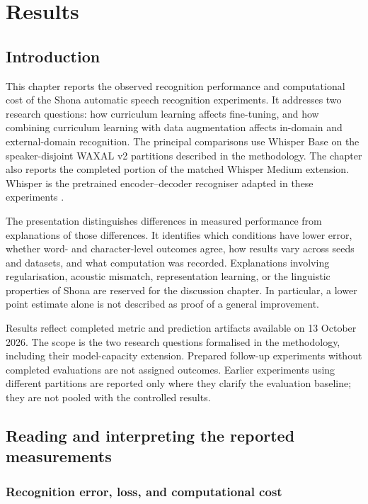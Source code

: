 \documentclass[12pt,a4paper]{report}
\begin{document}
\setcounter{chapter}{3}
\chapter{Results}
\label{chap:results}

\section{Introduction}

This chapter reports the observed recognition performance and computational cost of the Shona automatic speech recognition experiments. It addresses two research questions: how curriculum learning affects fine-tuning, and how combining curriculum learning with data augmentation affects in-domain and external-domain recognition. The principal comparisons use Whisper Base on the speaker-disjoint WAXAL v2 partitions described in the methodology. The chapter also reports the completed portion of the matched Whisper Medium extension. Whisper is the pretrained encoder--decoder recogniser adapted in these experiments \citep{Radford2023}.

The presentation distinguishes differences in measured performance from explanations of those differences. It identifies which conditions have lower error, whether word- and character-level outcomes agree, how results vary across seeds and datasets, and what computation was recorded. Explanations involving regularisation, acoustic mismatch, representation learning, or the linguistic properties of Shona are reserved for the discussion chapter. In particular, a lower point estimate alone is not described as proof of a general improvement.

Results reflect completed metric and prediction artifacts available on 13 October 2026. The scope is the two research questions formalised in the methodology, including their model-capacity extension. Prepared follow-up experiments without completed evaluations are not assigned outcomes. Earlier experiments using different partitions are reported only where they clarify the evaluation baseline; they are not pooled with the controlled results.

\section{Reading and interpreting the reported measurements}
\label{sec:results-conventions}

\subsection{Recognition error, loss, and computational cost}
\end{document}
